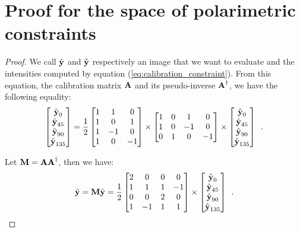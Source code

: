 \chapter{Proof for the space of polarimetric constraints}
\label{app:physical_prop}

\begin{proof}
	We call $\hat{\textbf{y}}$ and $\tilde{\textbf{y}}$ respectively an image that we want to evaluate and the intensities computed by equation (\ref{eq:calibration_constraint}). From this equation, the calibration matrix $\ma$ and its pseudo-inverse $\ma^\dagger$, we have the following equality:
	\begin{equation}
			\label{eq:app_problem}
		\begin{bmatrix} 
			\tilde{\textbf{y}}_0 \\
			\tilde{\textbf{y}}_{45} \\	
			\tilde{\textbf{y}}_{90} \\
			\tilde{\textbf{y}}_{135} 
		\end{bmatrix} = \frac{1}{2}\begin{bmatrix}
			1 & 1 & 0 \\
			1 & 0 & 1 \\
			1 & -1 & 0 \\
			1 & 0 & -1
		\end{bmatrix}
		\times \begin{bmatrix}
			1 & 0 & 1 & 0 \\
			1 & 0 & -1 & 0 \\
			0 & 1 & 0 & -1
		\end{bmatrix} \times \begin{bmatrix} 
			\hat{\textbf{y}}_0 \\
			\hat{\textbf{y}}_{45} \\
			\hat{\textbf{y}}_{90} \\
			\hat{\textbf{y}}_{135}
		\end{bmatrix}\enspace.
	\end{equation}
	
	Let $\mm = \ma\ma^\dagger$, then we have:
	$$
	\tilde{\vy} = \mm\hat{\vy} = \frac{1}{2}\begin{bmatrix}
		2 & 0 & 0 & 0 \\
		1 & 1 & 1 & -1 \\
		0 & 0 & 2 & 0 \\
		1 & -1 & 1 & 1
	\end{bmatrix} \times \begin{bmatrix} 
		\hat{\vy}_0 \\
		\hat{\vy}_{45} \\
		\hat{\vy}_{90} \\
		\hat{\vy}_{135}
	\end{bmatrix} \enspace.
	$$
	

\end{proof}

